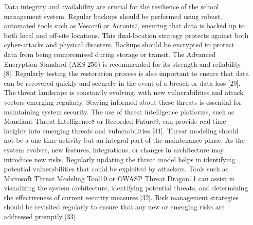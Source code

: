 \documentclass[letterpaper,twocolumn]{article}
\begin{document}
Data integrity and availability are crucial for the resilience of the school management system. Regular backups should be performed using robust, automated tools such as Veeam6 or Acronis7, ensuring that data is backed up to both local and off-site locations. This dual-location strategy protects against both cyber-attacks and physical disasters.
Backups should be encrypted to protect data from being compromised during storage or transit. The Advanced Encryption Standard (AES-256) is recommended for its strength and reliability [8]. Regularly testing the restoration process is also important to ensure that data can be recovered quickly and securely in the event of a breach or data loss [29].
The threat landscape is constantly evolving, with new vulnerabilities and attack vectors emerging regularly. Staying informed about these threats is essential for maintaining system security. The use of threat intelligence platforms, such as Mandiant Threat Intelligence8 or Recorded Future9, can provide real-time insights into emerging threats and vulnerabilities [31].
Threat modeling should not be a one-time activity but an integral part of the maintenance phase. As the system evolves, new features, integrations, or changes in architecture may introduce new risks. Regularly updating the threat model helps in identifying potential vulnerabilities that could be exploited by attackers.
Tools such as Microsoft Threat Modeling Tool10 or OWASP Threat Dragon11 can assist in visualizing the system architecture, identifying potential threats, and determining the effectiveness of current security measures [32]. Risk management strategies should be revisited regularly to ensure that any new or emerging risks are addressed promptly [33].
\end{document}
